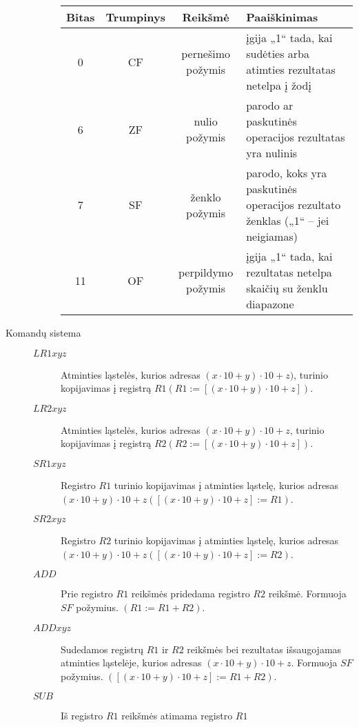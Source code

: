 \begin{description}
\begin{description}
        \begin{tabularx}{0.85\textwidth}{|c|c|c|X|} 
          \hline
          Bitas & Trumpinys & Reikšmė & Paaiškinimas \\
          \hline
          0 & CF & pernešimo požymis & įgija „1“ tada, kai sudėties arba
          atimties rezultatas netelpa į žodį \\
          \hline
          6 & ZF & nulio požymis & parodo ar paskutinės operacijos 
          rezultatas yra nulinis \\
          \hline
          7 & SF & ženklo požymis & parodo, koks yra paskutinės operacijos 
          rezultato ženklas („1“ – jei neigiamas) \\
          \hline
          11 & OF & perpildymo požymis & įgija „1“ tada, kai rezultatas
          netelpa skaičių su ženklu diapazone \\
          \hline
        \end{tabularx}
    \end{description}
  \item[Komandų sistema] 
    \begin{description}
        \item[$LR1 xyz$] Atminties ląstelės, kurios adresas 
          $(x \cdot 10 + y) \cdot 10 + z)$, turinio kopijavimas į 
          registrą $R1 (R1 := [(x \cdot 10 + y) \cdot 10 + z])$.
        \item[$LR2 xyz$] Atminties ląstelės, kurios adresas 
          $(x \cdot 10 + y) \cdot 10 + z$, turinio kopijavimas į 
          registrą $R2 (R2:=[(x \cdot 10+y) \cdot 10+z])$.
        \item[$SR1 xyz$] Registro $R1$ turinio kopijavimas į atminties 
          ląstelę, kurios adresas 
          $(x \cdot 10+y) \cdot 10+z ([(x \cdot 10+y) \cdot 10+z]:=R1)$.
        \item[$SR2 xyz$] Registro $R2$ turinio kopijavimas į atminties 
          ląstelę, kurios adresas 
          $(x \cdot 10+y) \cdot 10+z ([(x \cdot 10+y) \cdot 10+z]:=R2)$.
        \item[$ADD$] Prie registro $R1$ reikšmės pridedama registro $R2$ 
          reikšmė. Formuoja $SF$ požymius. $(R1:=R1+R2)$.
        \item[$ADD xyz$] Sudedamos registrų $R1$ ir $R2$ reikšmės bei 
          rezultatas išsaugojamas atminties ląstelėje, kurios adresas 
          $(x \cdot 10+y) \cdot 10+z$. Formuoja $SF$ požymius. 
          $([(x \cdot 10+y) \cdot 10+z]:=R1+R2)$.
        \item[$SUB$] Iš registro $R1$ reikšmės atimama registro $R1$ 

\end{description}
\end{description}
